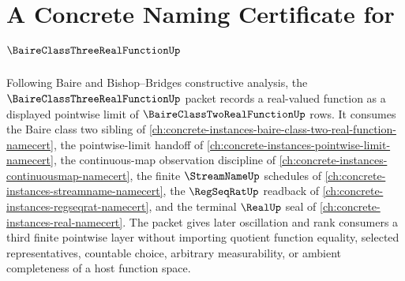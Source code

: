 \chapter{A Concrete Naming Certificate for $\BaireClassThreeRealFunctionUp$}
\label{ch:concrete-instances-baire-class-three-real-function-namecert}

Following Baire and Bishop--Bridges constructive analysis, the $\BaireClassThreeRealFunctionUp$ packet records a real-valued function as a displayed pointwise limit of $\BaireClassTwoRealFunctionUp$ rows. It consumes the Baire class two sibling of \autoref{ch:concrete-instances-baire-class-two-real-function-namecert}, the pointwise-limit handoff of \autoref{ch:concrete-instances-pointwise-limit-namecert}, the continuous-map observation discipline of \autoref{ch:concrete-instances-continuousmap-namecert}, the finite $\StreamNameUp$ schedules of \autoref{ch:concrete-instances-streamname-namecert}, the $\RegSeqRatUp$ readback of \autoref{ch:concrete-instances-regseqrat-namecert}, and the terminal $\RealUp$ seal of \autoref{ch:concrete-instances-real-namecert}. The packet gives later oscillation and rank consumers a third finite pointwise layer without importing quotient function equality, selected representatives, countable choice, arbitrary measurability, or ambient completeness of a host function space.

